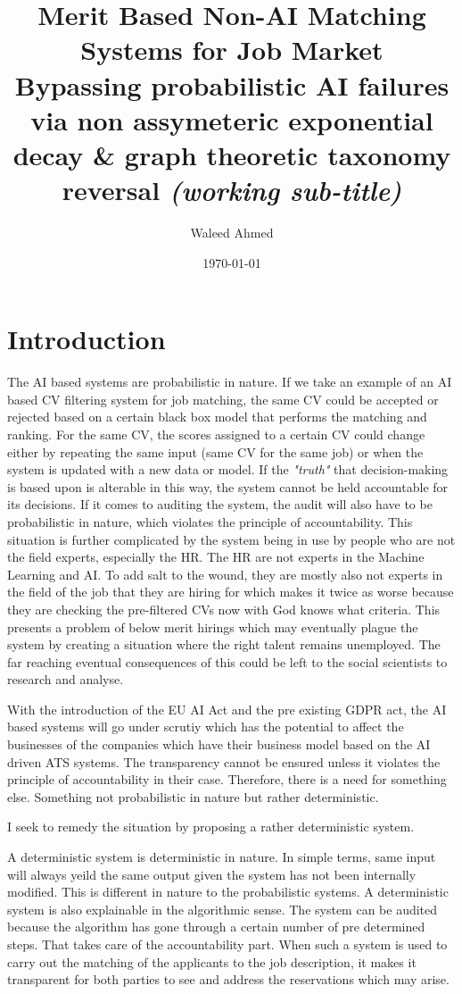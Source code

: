 \documentclass[a4paper, 12pt]{article}
\title{Merit Based Non-AI Matching Systems for Job Market \\[10pt] \large 
Bypassing probabilistic AI failures via non assymeteric exponential 
decay \& graph theoretic taxonomy reversal \textit{(working sub-title)}}
\author{Waleed Ahmed}
\date{\today}
\begin{document}
\maketitle

\section{Introduction} %

The AI based systems are probabilistic in nature. If we take an example of an AI based CV filtering system 
for job matching, the same CV could be accepted or rejected based on a certain black box model that performs the matching and ranking.
For the same CV, the scores assigned to a certain CV could change either by repeating the same input (same CV for the same job) or when the 
system is updated with a new data or model. If the \textit{"truth"} that decision-making is based upon is alterable in this way, the system 
cannot be held accountable for its decisions. If it comes to auditing the system, the audit will also have to be probabilistic in nature, which violates the principle of accountability. This situation is further complicated by the system being in use by people who are not the field experts, especially the HR. The HR are not experts in the Machine Learning and AI. To add salt to the wound, they are mostly also not experts in the field of the job that they are hiring for which makes it twice as worse because they are checking the pre-filtered CVs now with God knows what criteria. This presents a problem of below merit hirings which may eventually plague the system by creating a situation where the right talent remains unemployed. The far reaching eventual consequences of this could be left to the social scientists to research and analyse. 

With the introduction of the EU AI Act and the pre existing GDPR act, the AI based systems will go under scrutiy which has the potential to affect the businesses of the companies which have their business model based on the AI driven ATS systems. The transparency cannot be ensured unless it violates the principle of accountability in their case. Therefore, there is a need for something else. Something not probabilistic in nature but rather deterministic. 

I seek to remedy the situation by proposing a rather deterministic system. 

A deterministic system is deterministic in nature. In simple terms, same input will always yeild the same output given the system has not been internally modified. This is different in nature to the probabilistic systems. A deterministic system is also explainable in the algorithmic sense. The system can be audited because the algorithm has gone through a certain number of pre determined steps. That takes care of the accountability part. When such a system is used to carry out the matching of the applicants to the job description, it makes it transparent for both parties to see and address the reservations which may arise. 
\end{document}
